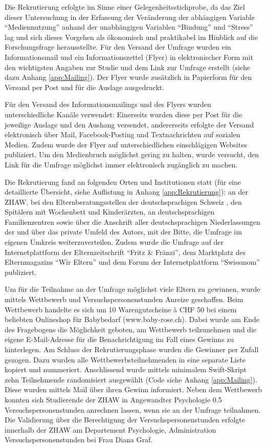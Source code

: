 Die Rekrutierung erfolgte im Sinne einer Gelegenheitsstichprobe, da das Ziel dieser Untersuchung in der Erfassung der Veränderung der abhängigen Variable \enquote{Mediennutzung} anhand der unabhängigen Variablen \enquote{Bindung} und \enquote{Stress} lag und sich dieses Vorgehen als ökonomisch und praktikabel \cite{TUDresden2015} im Hinblick auf die Forschungsfrage herausstellte. Für den Versand der Umfrage wurden ein Informationsmail und ein Informationszettel (Flyer) in elektronischer Form mit den wichtigsten Angaben zur Studie und dem Link zur Umfrage erstellt (siehe dazu Anhang \ref{app:Mailing}). Der Flyer wurde zusätzlich in Papierform für den Versand per Post und für die Auslage ausgedruckt. 

Für den Versand des Informationsmailings und des Flyers wurden unterschiedliche Kanäle verwendet: Einerseits wurden diese per Post für die jeweilige Auslage und den Aushang versendet, andererseits erfolgte der Versand elektronisch über Mail, Facebook-Posting und Textnachrichten auf sozialen Medien. Zudem wurde der Flyer auf unterschiedlichen einschlägigen Websites publiziert. Um den Medienbruch möglichst gering zu halten, wurde versucht, den Link für die Umfrage möglichst immer elektronisch zugänglich zu machen. 

Die Rekrutierung fand an folgenden Orten und Institutionen statt (für eine detaillierte Übersicht, siehe Auflistung in Anhang \ref{app:Rekrutierung}): an der ZHAW, bei den Elternberatungsstellen der deutschsprachigen Schweiz \cite{Sfmvb2018}, den Spitälern mit Wochenbett und Kinderärzten, an deutschsprachigen Familienzentren \cite{NetzwerkBildung2018} sowie über die Anschrift aller deutschsprachigen Niederlassungen der  und über das private Umfeld des Autors, mit der Bitte, die Umfrage im eigenen Umkreis weiterzuverteilen. Zudem wurde die Umfrage auf der Internetplattform der Elternzeitschrift \enquote{Fritz \&  Fränzi}, dem Marktplatz des Elternmagazins \enquote{Wir Eltern} und dem Forum der Internetplattform \enquote{Swissmom} publiziert.

Um für die Teilnahme an der Umfrage möglichst viele Eltern zu gewinnen, wurde mittels Wettbewerb und Versuchspersonenstunden Anreize geschaffen. Beim Wettbewerb handelte es sich um 10 Warengutscheine à CHF 50 bei einem beliebten Onlineshop für Babybedarf (www.baby-rose.ch). Dabei wurde am Ende des Fragebogens die Möglichkeit geboten, am Wettbewerb teilzunehmen und die eigene E-Mail-Adresse für die Benachrichtigung im Fall eines Gewinns zu hinterlegen. Am Schluss der Rekrutierungsphase wurden die Gewinner per Zufall gezogen. Dazu wurden alle Wettbewerbsteilnehmenden in eine separate Liste kopiert und nummeriert. Anschlissend wurde mittels minimalem Swift-Skript \cite{Swift2017} zehn Teilnehmende randomisiert ausgewählt (Code siehe Anhang \ref{app:Mailing}). Diese wurden mittels Mail über ihren Gewinn informiert. Neben dem Wettbewerb konnten sich Studierende der ZHAW in Angewandter Psychologie 0.5 Versuchspersonenstunden anrechnen lassen, wenn sie an der Umfrage teilnahmen. Die Validierung über die Berechtigung der Versuchs\-personen\-stunden erfolgte innerhalb der ZHAW am Departement Psychologie,  Administration Versuchs\-personen\-stunden bei Frau Diana Graf. 

